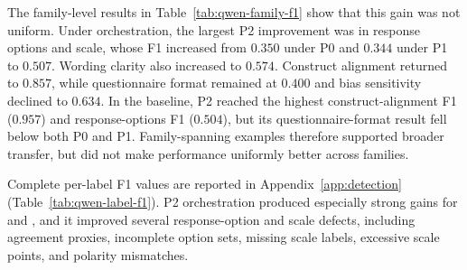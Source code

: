 \documentclass[11pt,a4paper]{article}
\newcommand{\code}[1]{%
    \texttt{\detokenize{#1}}%
}
\begin{document}
The family-level results in Table~\ref{tab:qwen-family-f1} show that this gain
was not uniform. Under orchestration, the largest P2 improvement was in response
options and scale, whose F1 increased from $0.350$ under P0 and $0.344$ under
P1 to $0.507$. Wording clarity also increased to $0.574$. Construct alignment
returned to $0.857$, while questionnaire format remained at $0.400$ and bias
sensitivity declined to $0.634$. In the baseline, P2 reached the highest
construct-alignment F1 ($0.957$) and response-options F1 ($0.504$), but its
questionnaire-format result fell below both P0 and P1. Family-spanning examples
therefore supported broader transfer, but did not make performance uniformly
better across families.

\begin{table}[H]
\centering
\caption{Qwen family-level micro-F1 across prompt packs.}
\label{tab:qwen-family-f1}
\small
\setlength{\tabcolsep}{4.5pt}
\end{table}

Complete per-label F1 values are reported in
Appendix~\ref{app:detection} (Table~\ref{tab:qwen-label-f1}). P2 orchestration
produced especially strong gains for \code{leading_question} and
\code{loaded_question}, and it improved several response-option and scale
defects, including agreement proxies, incomplete option sets, missing scale
labels, excessive scale points, and polarity mismatches.
\end{document}
